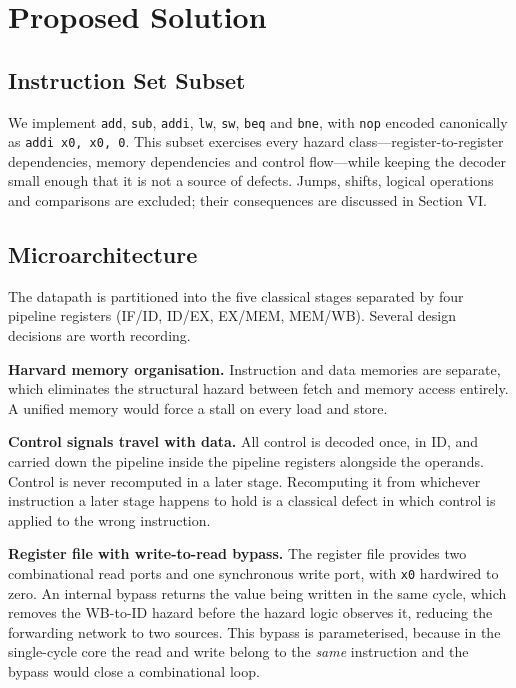 \documentclass[conference]{IEEEtran}
\begin{document}
\section{Proposed Solution}

\subsection{Instruction Set Subset}

We implement \texttt{add}, \texttt{sub}, \texttt{addi}, \texttt{lw},
\texttt{sw}, \texttt{beq} and \texttt{bne}, with \texttt{nop} encoded
canonically as \texttt{addi x0, x0, 0}. This subset exercises every
hazard class---register-to-register dependencies, memory dependencies and
control flow---while keeping the decoder small enough that it is not a
source of defects. Jumps, shifts, logical operations and comparisons are
excluded; their consequences are discussed in Section VI.

\subsection{Microarchitecture}

The datapath is partitioned into the five classical stages separated by
four pipeline registers (IF/ID, ID/EX, EX/MEM, MEM/WB). Several design
decisions are worth recording.

\textbf{Harvard memory organisation.} Instruction and data memories are
separate, which eliminates the structural hazard between fetch and memory
access entirely. A unified memory would force a stall on every load and
store.

\textbf{Control signals travel with data.} All control is decoded once, in
ID, and carried down the pipeline inside the pipeline registers alongside
the operands. Control is never recomputed in a later stage. Recomputing it
from whichever instruction a later stage happens to hold is a classical
defect in which control is applied to the wrong instruction.

\textbf{Register file with write-to-read bypass.} The register file
provides two combinational read ports and one synchronous write port, with
\texttt{x0} hardwired to zero. An internal bypass returns the value being
written in the same cycle, which removes the WB-to-ID hazard before the
hazard logic observes it, reducing the forwarding network to two sources.
This bypass is parameterised, because in the single-cycle core the read and
write belong to the \emph{same} instruction and the bypass would close a
combinational loop.
\end{document}
